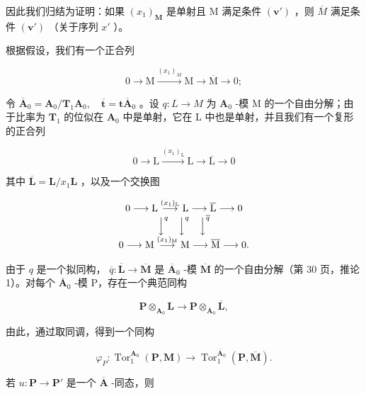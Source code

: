 因此我们归结为证明：如果 \((x_{1})_{\mathbf{M}}\) 是单射且 M 满足条件 \((\mathbf{v}')\) ，则 \(\overline{M}\) 满足条件 \((\mathbf{v}')\) （关于序列 \(x'\) ）。

根据假设，我们有一个正合列

\[
0 \longrightarrow \mathrm{M} \xrightarrow {(x _ {1}) _ {M}} \mathrm{M} \longrightarrow \overline {{\mathrm{M}}} \longrightarrow 0;
\]

令 \(\overline{\mathbf{A}}_{0} = \mathbf{A}_{0}/\mathbf{T}_{1}\mathbf{A}_{0},\quad\overline{\mathbf{t}} = \mathbf{t}\overline{\mathbf{A}}_{0}\) 。设 \(q:L\to M\) 为 \(\mathbf{A}_{0}\) -模 M 的一个自由分解；由于比率为 \(\mathbf{T}_{1}\) 的位似在 \(\mathbf{A}_{0}\) 中是单射，它在 L 中也是单射，并且我们有一个复形的正合列

\[
0 \longrightarrow \mathrm{L} \xrightarrow {(x _ {1}) _ {\mathrm{L}}} \mathrm{L} \longrightarrow \overline {{\mathrm{L}}} \longrightarrow 0
\]

其中 \(\overline{\mathbf{L}} = \mathbf{L} / x_1\mathbf{L}\) ，以及一个交换图

\[
\begin{array}{c} 0 \longrightarrow \mathrm{L} \stackrel {(x _ {1}) _ {\mathrm{L}}} {\longrightarrow} \mathrm{L} \longrightarrow \overline {{\mathrm{L}}} \longrightarrow 0 \\ \Big \downarrow^ {q} \quad \Big \downarrow^ {q} \quad \Big \downarrow^ {\overline {{q}}} \\ 0 \longrightarrow \mathrm{M} \stackrel {(x _ {1}) _ {\mathrm{M}}} {\longrightarrow} \mathrm{M} \longrightarrow \overline {{\mathrm{M}}} \longrightarrow 0. \end{array}
\]

由于 \(q\) 是一个拟同构， \(\overline{q}:\overline{\mathbf{L}}\to\overline{\mathbf{M}}\) 是 \(\overline{\mathbf{A}}_{0}\) -模 \(\overline{\mathbf{M}}\) 的一个自由分解（第 30 页，推论 1）。对每个 \(\overline{\mathbf{A}}_{0}\) -模 P，存在一个典范同构

\[
\mathbf {P} \otimes_ {\mathbf {A} _ {0}} \mathbf {L} \rightarrow \mathbf {P} \otimes_ {\overline {{{\mathbf {A}}}} _ {0}} \overline {{{\mathbf {L}}}},
\]

由此，通过取同调，得到一个同构

\[
\varphi_ {P}: \operatorname{Tor} _ {1} ^ {\mathbf {A} _ {0}} (\mathbf {P}, \mathbf {M}) \rightarrow \operatorname{Tor} _ {1} ^ {\overline {{\mathbf {A}}} _ {0}} (\mathbf {P}, \overline {{\mathbf {M}}}).
\]

若 \(u: \mathbf{P} \to \mathbf{P}'\) 是一个 \(\overline{\mathbf{A}}\) -同态，则


